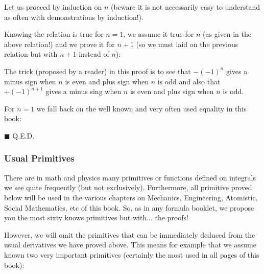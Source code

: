 	\begin{dem}
	Let us proceed by induction on $n$ (beware it is not necessarily easy to understand as often with demonstrations by induction!).
	
	Knowing the relation is true for $n = 1$, we assume it true for $n$ (as given in the above relation!) and we prove it for $n + 1$ (so we must laid on the previous relation but with $n + 1$ instead of $n$):
	
	\begin{tcolorbox}[title=Remark,colframe=black,arc=10pt]
	The trick (proposed by a reader) in this proof is to see that $-(-1)^n$ gives a minus sign when $n$ is even and plus sign when $n$ is odd and also that $+(-1)^{n+1}$ gives a minus sing when $n$ is even and plus sign when $n$ is odd.
	\end{tcolorbox}
	For $n = 1$ we fall back on the well known and very often used equality in this book:
	
	\begin{flushright}
		$\blacksquare$  Q.E.D.
	\end{flushright}
	\end{dem}

	\pagebreak
	\subsubsection{Usual Primitives}\label{usual primitives}
	There are in math and physics many primitives or functions defined on integrals we see  quite frequently (but not exclusively). Furthermore, all primitive proved below will be used in the various chapters on Mechanics, Engineering, Atomistic, Social Mathematics, etc of this book. So, as in any formula booklet, we propose you the most sixty knows primitives but with... the proofs!
	
	However, we will omit the primitives that can be immediately deduced from the usual derivatives we have proved above. This means for example that we assume  known two very important primitives (certainly the most used in all pages of this book):
		
